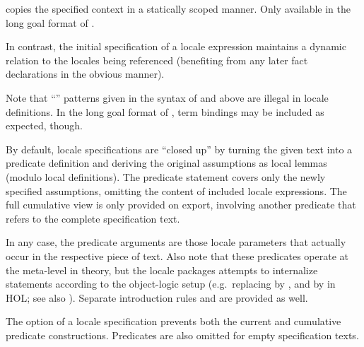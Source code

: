 \begin{isabellebody}
\begin{isamarkuptext}
\begin{descr}
\begin{descr}
  \item [\hyperlink{element.includes}{\mbox{\isa{\isakeyword{includes}}}}~\isa{c}] copies the specified context
  in a statically scoped manner.  Only available in the long goal
  format of .

  In contrast, the initial  specification of a locale
  expression maintains a dynamic relation to the locales being
  referenced (benefiting from any later fact declarations in the
  obvious manner).

  \end{descr}
  
  Note that ``'' patterns given
  in the syntax of \hyperlink{element.assumes}{\mbox{}} and \hyperlink{element.defines}{\mbox{}} above
  are illegal in locale definitions.  In the long goal format of
  , term bindings may be included as expected,
  though.
  
  \medskip By default, locale specifications are ``closed up'' by
  turning the given text into a predicate definition  and deriving the original assumptions as local lemmas
  (modulo local definitions).  The predicate statement covers only the
  newly specified assumptions, omitting the content of included locale
  expressions.  The full cumulative view is only provided on export,
  involving another predicate  that refers to the complete
  specification text.
  
  In any case, the predicate arguments are those locale parameters
  that actually occur in the respective piece of text.  Also note that
  these predicates operate at the meta-level in theory, but the locale
  packages attempts to internalize statements according to the
  object-logic setup (e.g.\ replacing \isa{{\isasymAnd}} by \isa{{\isasymforall}}, and
  \isa{{\isachardoublequote}{\isasymLongrightarrow}{\isachardoublequote}} by \isa{{\isachardoublequote}{\isasymlongrightarrow}{\isachardoublequote}} in HOL; see also
  ).  Separate introduction rules  and  are provided as well.
  
  The  option of a locale specification prevents both
  the current  and cumulative  predicate
  constructions.  Predicates are also omitted for empty specification
  texts.


\end{descr}
\end{isamarkuptext}
\end{isabellebody}
